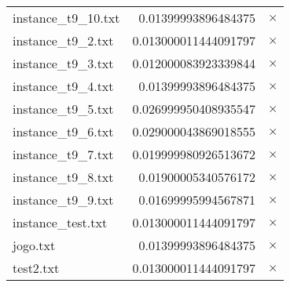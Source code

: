 \documentclass{article}
\begin{document}
\begin{center}
\begin{tabular}{|l|rr|}
instance\_t9\_10.txt & 0.01399993896484375 & $\times$ \\
instance\_t9\_2.txt & 0.013000011444091797 & $\times$ \\
instance\_t9\_3.txt & 0.012000083923339844 & $\times$ \\
instance\_t9\_4.txt & 0.01399993896484375 & $\times$ \\
instance\_t9\_5.txt & 0.026999950408935547 & $\times$ \\
instance\_t9\_6.txt & 0.029000043869018555 & $\times$ \\
instance\_t9\_7.txt & 0.019999980926513672 & $\times$ \\
instance\_t9\_8.txt & 0.01900005340576172 & $\times$ \\
instance\_t9\_9.txt & 0.01699995994567871 & $\times$ \\
instance\_test.txt & 0.013000011444091797 & $\times$ \\
jogo.txt & 0.01399993896484375 & $\times$ \\
test2.txt & 0.013000011444091797 & $\times$ \\
\hline
\end{tabular}
\end{center}
\end{document}
